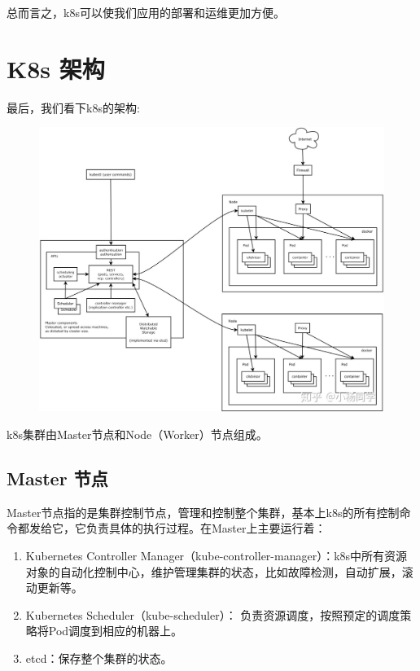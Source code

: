 \documentclass[12pt]{article}
\begin{document}
总而言之，k8s可以使我们应用的部署和运维更加方便。

\section{K8s 架构}
最后，我们看下k8s的架构:
\begin{figure}[H]
    \centering
    \includegraphics[width=1\textwidth]{fig/K8s_Structure.jpg}
\end{figure}

k8s集群由Master节点和Node（Worker）节点组成。

\subsection{Master 节点}
Master节点指的是集群控制节点，管理和控制整个集群，基本上k8s的所有控制命令都发给它，它负责具体的执行过程。在Master上主要运行着：

\begin{enumerate}
\setlength{\itemsep}{0pt}
\setlength{\parsep}{0pt}
\setlength{\parskip}{0pt}
    \item Kubernetes Controller Manager（kube-controller-manager）：k8s中所有资源对象的自动化控制中心，维护管理集群的状态，比如故障检测，自动扩展，滚动更新等。
    \item Kubernetes Scheduler（kube-scheduler）： 负责资源调度，按照预定的调度策略将Pod调度到相应的机器上。
    \item etcd：保存整个集群的状态。
\end{enumerate}
\end{document}
